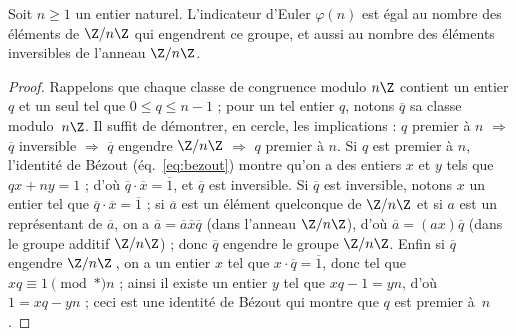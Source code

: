 \documentclass[11pt, %
  title in boldface,
  theorem in new line,
  theorem numbering = section,
  number theorems separately,
  simple name,
]{beaulivre}
\begin{document}
    \begin{proposition}\label{prop:indicateur d'Euler et Z/nZ}
        Soit \( n \geqslant 1 \) un entier naturel. L'indicateur d'Euler \( \varphi(n) \) est égal au nombre des éléments de \( \Z/n\Z \) qui engendrent ce groupe, et aussi au nombre des éléments inversibles de l'anneau \( \Z/n\Z \).
    \end{proposition}
    \begin{proof}
        Rappelons que chaque classe de congruence modulo \( n\Z \) contient un entier \( q \) et un seul tel que \( 0 \leqslant q \leqslant n-1 \) ; pour un tel entier \( q \), notons \( \overline{q} \) sa classe modulo~\( n\Z \). Il suffit de démontrer, en cercle, les implications : \( q \) premier à \( n \) \( \Rightarrow \) \( \overline{q} \) inversible \( \Rightarrow \) \( \overline{q} \) engendre \( \Z/n\Z \) \( \Rightarrow \) \( q \) premier à \( n \). Si \( q \) est premier à \( n \), l'identité de Bézout (éq.~\eqref{eq:bezout}) montre qu'on a des entiers \( x \) et \( y \) tels que \( qx+ny=1 \) ; d'où \( \overline{q} \cdot \overline{x} = \overline{1} \), et \( \overline{q} \) est inversible. Si \( \overline{q} \) est inversible, notons \( x \) un entier tel que \( \overline{q} \cdot \overline{x} = \overline{1} \) ; si \( \overline{a} \) est un élément quelconque de \( \Z/n\Z \) et si \( a \) est un représentant de \( \overline{a} \), on a \( \overline{a} = \overline{a} \overline{x} \overline{q} \) (dans l'anneau \( \Z/n\Z \)), d'où \( \overline{a} = (ax) \overline{q} \) (dans le groupe additif \( \Z/n\Z \)) ; donc \( \overline{q} \) engendre le groupe \( \Z/n\Z \). Enfin si \( \overline{q} \) engendre \( \Z/n\Z \)\,, on a un entier \( x \) tel que \( x \cdot \overline{q} = \overline{1} \), donc tel que \( xq \equiv 1 \pmod*{n} \) ; ainsi il existe un entier \( y \) tel que \( xq-1 = yn \), d'où \( 1 = xq-yn \) ; ceci est une identité de Bézout qui montre que \( q \) est premier à~\( n \).
    \end{proof}
\end{document}
